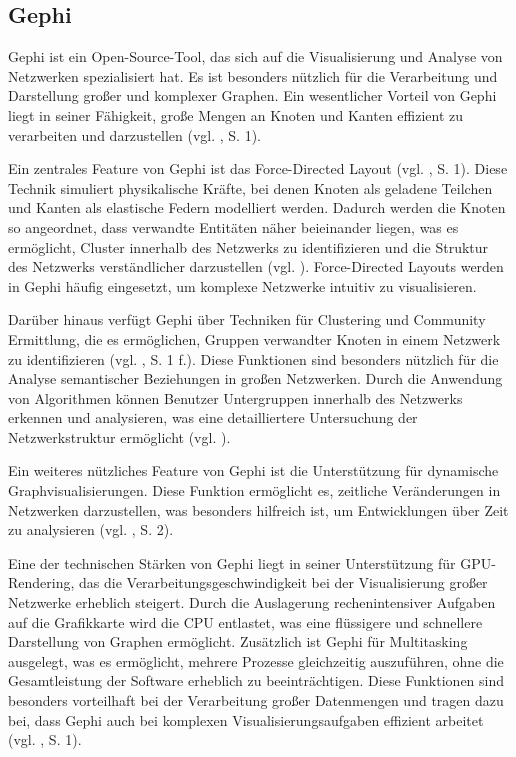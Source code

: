 \subsection{Gephi}

Gephi ist ein Open-Source-Tool, das sich auf die Visualisierung und Analyse von Netzwerken spezialisiert hat. Es ist besonders nützlich für die Verarbeitung und Darstellung großer und komplexer Graphen. Ein wesentlicher Vorteil von Gephi liegt in seiner Fähigkeit, große Mengen an Knoten und Kanten effizient zu verarbeiten und darzustellen (vgl. \cite{gephi:Bastian}, S. 1).

Ein zentrales Feature von Gephi ist das Force-Directed Layout (vgl. \cite{gephi:Bastian}, S. 1). Diese Technik simuliert physikalische Kräfte, bei denen Knoten als geladene Teilchen und Kanten als elastische Federn modelliert werden. Dadurch werden die Knoten so angeordnet, dass verwandte Entitäten näher beieinander liegen, was es ermöglicht, Cluster innerhalb des Netzwerks zu identifizieren und die Struktur des Netzwerks verständlicher darzustellen (vgl. \cite{forceGraph:yWorks}). Force-Directed Layouts werden in Gephi häufig eingesetzt, um komplexe Netzwerke intuitiv zu visualisieren.

Darüber hinaus verfügt Gephi über Techniken für Clustering und Community Ermittlung, die es ermöglichen, Gruppen verwandter Knoten in einem Netzwerk zu identifizieren (vgl. \cite{gephi:Bastian}, S. 1 f.). Diese Funktionen sind besonders nützlich für die Analyse semantischer Beziehungen in großen Netzwerken. Durch die Anwendung von Algorithmen können Benutzer Untergruppen innerhalb des Netzwerks erkennen und analysieren, was eine detailliertere Untersuchung der Netzwerkstruktur ermöglicht (vgl. \cite{clusteringGraph:yWorks}).

Ein weiteres nützliches Feature von Gephi ist die Unterstützung für dynamische Graphvisualisierungen. Diese Funktion ermöglicht es, zeitliche Veränderungen in Netzwerken darzustellen, was besonders hilfreich ist, um Entwicklungen über Zeit zu analysieren (vgl. \cite{gephi:Bastian}, S. 2).

Eine der technischen Stärken von Gephi liegt in seiner Unterstützung für GPU-Rendering, das die Verarbeitungsgeschwindigkeit bei der Visualisierung großer Netzwerke erheblich steigert. Durch die Auslagerung rechenintensiver Aufgaben auf die Grafikkarte wird die CPU entlastet, was eine flüssigere und schnellere Darstellung von Graphen ermöglicht. Zusätzlich ist Gephi für Multitasking ausgelegt, was es ermöglicht, mehrere Prozesse gleichzeitig auszuführen, ohne die Gesamtleistung der Software erheblich zu beeinträchtigen. Diese Funktionen sind besonders vorteilhaft bei der Verarbeitung großer Datenmengen und tragen dazu bei, dass Gephi auch bei komplexen Visualisierungsaufgaben effizient arbeitet (vgl. \cite{gephi:Bastian}, S. 1).

